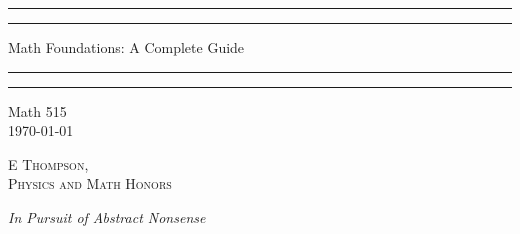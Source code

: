 \documentclass[12pt, a4paper, oneside, openright, titlepage]{book}
\begin{document}

\begin{titlepage}
    \centering
    \scshape
    \vspace*{\baselineskip}
    \rule{\textwidth}{1.6pt}\vspace*{-\baselineskip}\vspace*{2pt}
    \rule{\textwidth}{0.4pt}
    
    \vspace{0.75\baselineskip}
    
    {\LARGE Math Foundations: A Complete Guide}
    
    \vspace{0.75\baselineskip}
    
    \rule{\textwidth}{0.4pt}\vspace*{-\baselineskip}\vspace{3.2pt}
    \rule{\textwidth}{1.6pt}
    
    \vspace{2\baselineskip}
    Math 515 \\
    \vspace*{3\baselineskip}
    \monthdayyeardate\today \\
    \vspace*{5.0\baselineskip}
    
    {\scshape\Large E Thompson, \\ Physics and Math Honors\\}
    
    \vspace{1.0\baselineskip}
    \textit{In Pursuit of Abstract Nonsense}
    \vfill
    \enlargethispage{1in}
    \begin{figure}[b!]
    \end{figure}
\end{titlepage}
\end{document}
